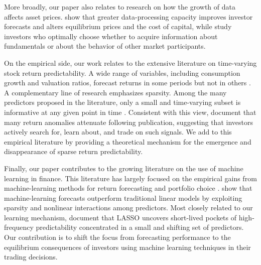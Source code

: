 \documentclass[11pt]{article}
\begin{document}
More broadly, our paper also relates to research on how the growth of data affects asset prices. 
\citet{begenau2018big} show that greater data-processing capacity improves investor forecasts and alters equilibrium prices and the cost of capital, while \citet{farboodi2020long} study investors who optimally choose whether to acquire information about fundamentals or about the behavior of other market participants.

On the empirical side, our work relates to the extensive literature on time-varying stock return predictability. 
A wide range of variables, including consumption growth and valuation ratios, forecast returns in some periods but not in others \citep{AngBekaert2007RFS,GoyalWelch2003MS,LettauLudvigson2001JF}. 
A complementary line of research emphasizes sparsity.
Among the many predictors proposed in the literature, only a small and time-varying subset is informative at any given point in time \citep{kozak2020shrinking,freyberger2020dissecting}. 
Consistent with this view, \citet{Mclean2016} document that many return anomalies attenuate following publication, suggesting that investors actively search for, learn about, and trade on such signals.
We add to this empirical literature by providing a theoretical mechanism for the emergence and disappearance  of sparse return predictability.

Finally, our paper contributes to the growing literature on the use of machine learning in finance. 
This literature has largely focused on the empirical gains from machine-learning methods for return forecasting and portfolio choice \citep{Feng2020}. 
\citet{Gu2020} show that machine-learning forecasts outperform traditional linear models by exploiting sparsity and nonlinear interactions among predictors. 
Most closely related to our learning mechanism, \citet{Chinco2019} document that LASSO uncovers short-lived pockets of high-frequency predictability concentrated in a small and shifting set of predictors. 
Our contribution is to shift the focus from forecasting performance to the equilibrium consequences of investors using machine learning techniques in their trading decisions.

\end{document}
